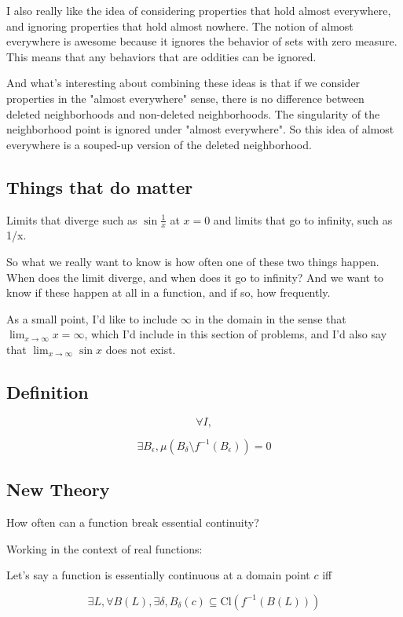 \documentclass{article}
\begin{document}
I also really like the idea of considering properties that hold almost everywhere, and ignoring properties that hold almost nowhere. The notion of almost everywhere is awesome because it ignores the behavior of sets with zero measure. This means that any behaviors that are oddities can be ignored. 

And what's interesting about combining these ideas is that if we consider properties in the "almost everywhere" sense, there is no difference between deleted neighborhoods and non-deleted neighborhoods. The singularity of the neighborhood point is ignored under "almost everywhere".  So this idea of almost everywhere is a souped-up version of the deleted neighborhood.

\subsection{Things that do matter}
Limits that diverge such as $\sin \frac{1}{x}$ at $x=0$ and limits that go to infinity, such as 1/x. 

So what we really want to know is how often one of these two things happen. When does the limit diverge, and when does it go to infinity? And we want to know if these happen at all in a function, and if so, how frequently. 

As a small point, I'd like to include $\infty$ in the domain in the sense that $\displaystyle \lim_{x \to \infty} x = \infty$, which I'd include in this section of problems, and I'd also say that $\displaystyle \lim_{x \to \infty} \sin x$ does not exist.  

\subsection{Definition}

$$\forall I, $$

$$\exists B_{\epsilon} , \mu(B_{\delta} \setminus f^{-1}(B_\epsilon)) = 0$$

\subsection{New Theory}

How often can a function break essential continuity?

Working in the context of real functions:

Let's say a function is essentially continuous at a domain point $c$ iff

$$\exists L, \forall B(L), \exists \delta, B_\delta (c) \subseteq \textrm{Cl}(f^{-1}(B(L)))$$
\end{document}
